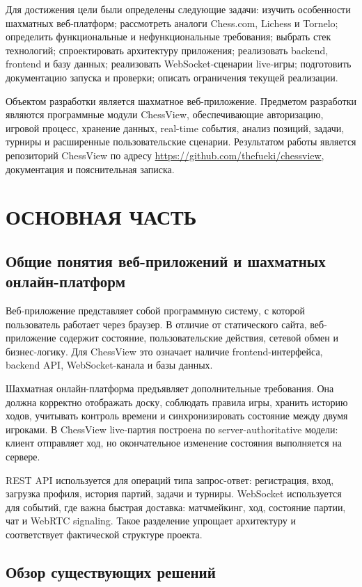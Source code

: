 \documentclass[14pt,a4paper]{extreport}
\begin{document}
Для достижения цели были определены следующие задачи: изучить особенности шахматных веб-платформ; рассмотреть аналоги Chess.com, Lichess и Tornelo; определить функциональные и нефункциональные требования; выбрать стек технологий; спроектировать архитектуру приложения; реализовать backend, frontend и базу данных; реализовать WebSocket-сценарии live-игры; подготовить документацию запуска и проверки; описать ограничения текущей реализации.

Объектом разработки является шахматное веб-приложение. Предметом разработки являются программные модули ChessView, обеспечивающие авторизацию, игровой процесс, хранение данных, real-time события, анализ позиций, задачи, турниры и расширенные пользовательские сценарии. Результатом работы является репозиторий ChessView по адресу \url{https://github.com/thefueki/chessview}, документация и пояснительная записка.

\chapter{ОСНОВНАЯ ЧАСТЬ}

\section{Общие понятия веб-приложений и шахматных онлайн-платформ}

Веб-приложение представляет собой программную систему, с которой пользователь работает через браузер. В отличие от статического сайта, веб-приложение содержит состояние, пользовательские действия, сетевой обмен и бизнес-логику. Для ChessView это означает наличие frontend-интерфейса, backend API, WebSocket-канала и базы данных.

Шахматная онлайн-платформа предъявляет дополнительные требования. Она должна корректно отображать доску, соблюдать правила игры, хранить историю ходов, учитывать контроль времени и синхронизировать состояние между двумя игроками. В ChessView live-партия построена по server-authoritative модели: клиент отправляет ход, но окончательное изменение состояния выполняется на сервере.

REST API используется для операций типа запрос-ответ: регистрация, вход, загрузка профиля, история партий, задачи и турниры. WebSocket используется для событий, где важна быстрая доставка: матчмейкинг, ход, состояние партии, чат и WebRTC signaling. Такое разделение упрощает архитектуру и соответствует фактической структуре проекта.

\section{Обзор существующих решений}
\end{document}

